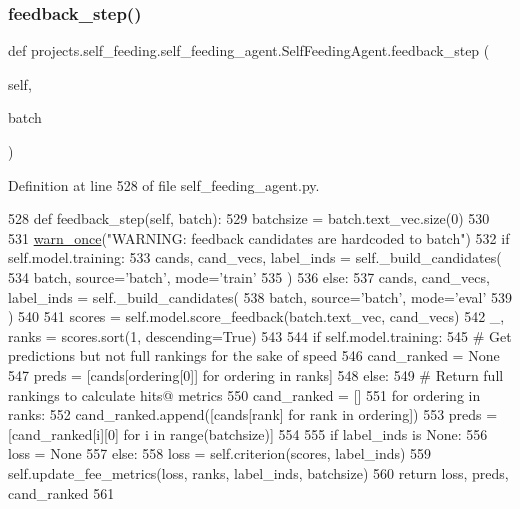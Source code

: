 \subsubsection{\texorpdfstring{feedback\+\_\+step()}{feedback\_step()}}
{\footnotesize\ttfamily def projects.\+self\+\_\+feeding.\+self\+\_\+feeding\+\_\+agent.\+Self\+Feeding\+Agent.\+feedback\+\_\+step (\begin{DoxyParamCaption}\item[{}]{self,  }\item[{}]{batch }\end{DoxyParamCaption})}



Definition at line 528 of file self\+\_\+feeding\+\_\+agent.\+py.


\begin{DoxyCode}
528     \textcolor{keyword}{def }feedback\_step(self, batch):
529         batchsize = batch.text\_vec.size(0)
530 
531         \hyperlink{namespaceparlai_1_1utils_1_1misc_acf146e70ea7f6867969a7c2b545d4b4b}{warn\_once}(\textcolor{stringliteral}{"WARNING: feedback candidates are hardcoded to batch"})
532         \textcolor{keywordflow}{if} self.model.training:
533             cands, cand\_vecs, label\_inds = self.\_build\_candidates(
534                 batch, source=\textcolor{stringliteral}{'batch'}, mode=\textcolor{stringliteral}{'train'}
535             )
536         \textcolor{keywordflow}{else}:
537             cands, cand\_vecs, label\_inds = self.\_build\_candidates(
538                 batch, source=\textcolor{stringliteral}{'batch'}, mode=\textcolor{stringliteral}{'eval'}
539             )
540 
541         scores = self.model.score\_feedback(batch.text\_vec, cand\_vecs)
542         \_, ranks = scores.sort(1, descending=\textcolor{keyword}{True})
543 
544         \textcolor{keywordflow}{if} self.model.training:
545             \textcolor{comment}{# Get predictions but not full rankings for the sake of speed}
546             cand\_ranked = \textcolor{keywordtype}{None}
547             preds = [cands[ordering[0]] \textcolor{keywordflow}{for} ordering \textcolor{keywordflow}{in} ranks]
548         \textcolor{keywordflow}{else}:
549             \textcolor{comment}{# Return full rankings to calculate hits@ metrics}
550             cand\_ranked = []
551             \textcolor{keywordflow}{for} ordering \textcolor{keywordflow}{in} ranks:
552                 cand\_ranked.append([cands[rank] \textcolor{keywordflow}{for} rank \textcolor{keywordflow}{in} ordering])
553             preds = [cand\_ranked[i][0] \textcolor{keywordflow}{for} i \textcolor{keywordflow}{in} range(batchsize)]
554 
555         \textcolor{keywordflow}{if} label\_inds \textcolor{keywordflow}{is} \textcolor{keywordtype}{None}:
556             loss = \textcolor{keywordtype}{None}
557         \textcolor{keywordflow}{else}:
558             loss = self.criterion(scores, label\_inds)
559             self.update\_fee\_metrics(loss, ranks, label\_inds, batchsize)
560         \textcolor{keywordflow}{return} loss, preds, cand\_ranked
561 
\end{DoxyCode}

